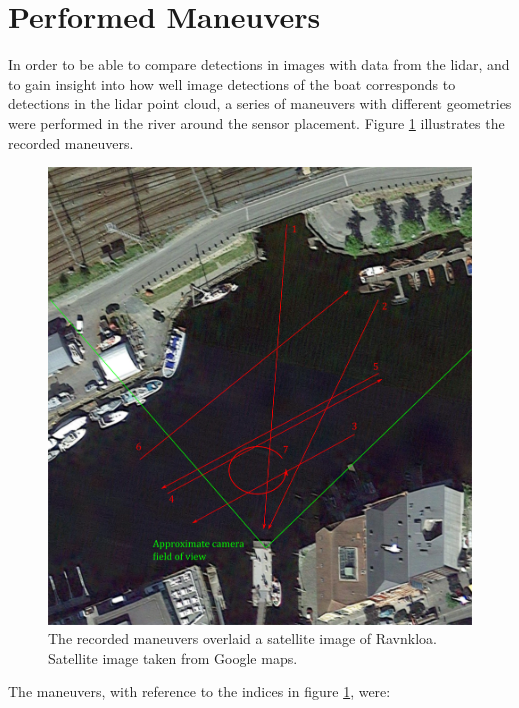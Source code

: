 \section{Performed Maneuvers}
In order to be able to compare detections in images with data from the lidar, and to gain insight into how well image detections of the boat corresponds to detections in the lidar point cloud, a series of maneuvers with different geometries were performed in the river around the sensor placement. Figure \ref{fig:experiments} illustrates the recorded maneuvers.
\begin{figure}[!htb]
	\centering
	\includegraphics[width=.8\linewidth]{fig/experiments_performed.png}
	\caption{The recorded maneuvers overlaid a satellite image of Ravnkloa. Satellite image taken from Google maps.}
	\label{fig:experiments}
\end{figure}
The maneuvers, with reference to the indices in figure \ref{fig:experiments}, were:
